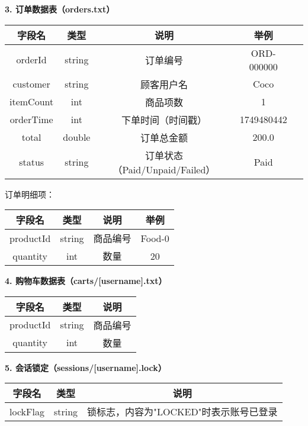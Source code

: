 \documentclass[11pt]{article}
\begin{document}
\vspace{0.5em}
\textbf{3. 订单数据表（orders.txt）}
\begin{center}
\begin{tabular}{|c|c|c|c|c|}
\hline
\textbf{字段名} & \textbf{类型} & \textbf{说明} & \textbf{举例} \\
\hline
orderId    & string & 订单编号          & ORD-000000 \\
customer   & string & 顾客用户名        & Coco \\
itemCount  & int    & 商品项数          & 1 \\
orderTime  & int    & 下单时间（时间戳） & 1749480442 \\
total      & double & 订单总金额        & 200.0 \\
status     & string & 订单状态（Paid/Unpaid/Failed） & Paid \\
\hline
\end{tabular}
\end{center}
订单明细项：
\begin{center}
\begin{tabular}{|c|c|c|c|}
\hline
\textbf{字段名} & \textbf{类型} & \textbf{说明} & \textbf{举例} \\
\hline
productId  & string & 商品编号   & Food-0 \\
quantity   & int    & 数量       & 20 \\
\hline
\end{tabular}
\end{center}

\vspace{0.5em}
\textbf{4. 购物车数据表（carts/[username].txt）}
\begin{center}
\begin{tabular}{|c|c|c|}
\hline
\textbf{字段名} & \textbf{类型} & \textbf{说明} \\
\hline
productId  & string & 商品编号 \\
quantity   & int    & 数量 \\
\hline
\end{tabular}
\end{center}

\vspace{0.5em}
\textbf{5. 会话锁定（sessions/[username].lock）}

\begin{center}
\begin{tabular}{|c|c|c|}
\hline
\textbf{字段名} & \textbf{类型} & \textbf{说明} \\
\hline
lockFlag & string & 锁标志，内容为"LOCKED"时表示账号已登录 \\
\hline
\end{tabular}
\end{center}
\end{document}
